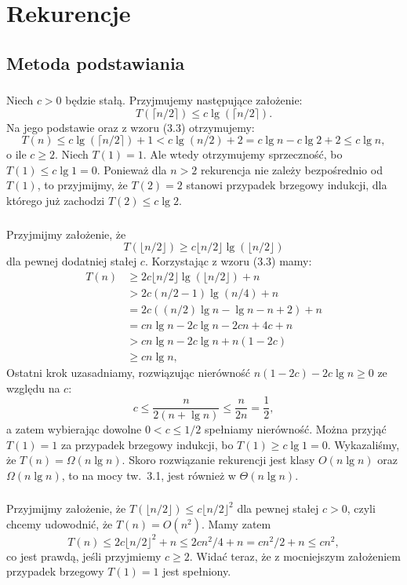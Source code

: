 \chapter{Rekurencje}

\section{Metoda podstawiania}

\subsection{} %
Niech $c>0$ będzie stałą. Przyjmujemy następujące założenie:
\[
	T(\lceil n/2\rceil) \le c\lg(\lceil n/2\rceil).
\]
Na jego podstawie oraz z wzoru (3.3) otrzymujemy:
\[
	T(n) \le c\lg(\lceil n/2\rceil)+1 < c\lg (n/2)+2 = c\lg n-c\lg 2+2 \le c\lg n,
\]
o ile $c\ge2$. Niech $T(1)=1$. Ale wtedy otrzymujemy sprzeczność, bo $T(1)\le c\lg1=0$. Ponieważ dla $n>2$ rekurencja nie zależy bezpośrednio od $T(1)$, to przyjmijmy, że $T(2)=2$ stanowi przypadek brzegowy indukcji, dla którego już zachodzi $T(2)\le c\lg2$.

\subsection{} %
Przyjmijmy założenie, że
\[
	T(\lfloor n/2\rfloor) \ge c\lfloor n/2\rfloor\lg(\lfloor n/2\rfloor)
\]
dla pewnej dodatniej stałej $c$. Korzystając z wzoru (3.3) mamy:
\begin{align*}
	T(n) &\ge 2c\lfloor n/2\rfloor\lg(\lfloor n/2\rfloor)+n \\
	&> 2c(n/2-1)\lg(n/4)+n \\
	&= 2c((n/2)\lg n-\lg n-n+2)+n \\
	&= cn\lg n-2c\lg n-2cn+4c+n \\
	&> cn\lg n-2c\lg n+n(1-2c) \\
	&\ge cn\lg n,
\end{align*}
Ostatni krok uzasadniamy, rozwiązując nierówność $n(1-2c)-2c\lg n\ge0$ ze względu na $c$:
\[
	c \le \frac{n}{2(n+\lg n)} \le \frac{n}{2n} = \frac{1}{2},
\]
a zatem wybierając dowolne $0<c\le1/2$ spełniamy nierówność. Można przyjąć $T(1)=1$ za przypadek brzegowy indukcji, bo $T(1)\ge c\lg1=0$. Wykazaliśmy, że $T(n)=\Omega(n\lg n)$. Skoro rozwiązanie rekurencji jest klasy $O(n\lg n)$ oraz $\Omega(n\lg n)$, to na mocy tw.~3.1, jest również w $\Theta(n\lg n)$.

\subsection{} %
Przyjmijmy założenie, że $T(\lfloor n/2\rfloor)\le c\lfloor n/2\rfloor^2$ dla pewnej stałej $c>0$, czyli chcemy udowodnić, że $T(n)=O(n^2)$. Mamy zatem
\[
	T(n) \le 2c\lfloor n/2\rfloor^2+n \le 2cn^2\!/4 + n = cn^2\!/2+n \le cn^2,
\]
co jest prawdą, jeśli przyjmiemy $c\ge2$. Widać teraz, że z mocniejszym założeniem przypadek brzegowy $T(1)=1$ jest spełniony.

